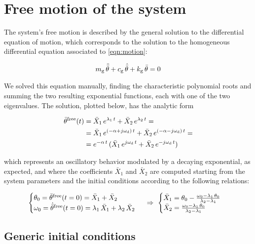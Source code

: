 \documentclass[a4paper,12pt,oneside]{article}
\begin{document}
\section{Free motion of the system}

The system's free motion is described by the general solution to the differential equation of motion, which corresponds to the solution to the homogeneous differential equation associated to \eqref{eqn:motion}:

\[
	m_\textup{g} \, \ddot{\bar{\theta}} + c_\textup{g} \, \dot{\bar{\theta}} +
		k_\textup{g} \, \bar{\theta} = 0
\]

We solved this equation manually, finding the characteristic polynomial roots and summing the two resulting exponential functions, each with one of the two eigenvalues. The solution, plotted below, has the analytic form

\[ \begin{split}
	\bar{\theta}^\textup{free}(t)	&
		= \bar{X}_1 \, e^{\lambda_1 \, t} + \bar{X}_2 \, e^{\lambda_2 \, t} = \\
	& = \bar{X}_1 \, e^{(-\alpha + j \omega_\textup{d}) \, t} +
		\bar{X}_2 \, e^{(-\alpha - j \omega_\textup{d}) \, t} = \\
	& = e^{-\alpha \, t} \, (\bar{X}_1 \, e^{j \omega_\textup{d} \, t} +
		\bar{X}_2 \, e^{- j \omega_\textup{d} \, t})
\end{split} \]

which represents an oscillatory behavior modulated by a decaying exponential, as expected, and where the coefficients $ \bar{X}_1 $ and $ \bar{X}_2 $ are computed starting from the system parameters and the initial conditions according to the following relations:

\[
	\begin{cases}
		\theta_0 = \bar{\theta}^\textup{free}(t = 0) = \bar{X}_1 + \bar{X}_2 \\
		\omega_0 = \dot{\bar{\theta}}^\textup{free}(t = 0) =
			\lambda_1 \, \bar{X}_1 + \lambda_2 \, \bar{X}_2
	\end{cases} ~ \Rightarrow ~
		\begin{cases}
			\bar{X}_1 = \theta_0 - \frac{\omega_0 - \lambda_1 \, \theta_0}
				{\lambda_2 - \lambda_1} \\
			\bar{X}_2 = \frac{\omega_0 - \lambda_1 \, \theta_0}{\lambda_2 - \lambda_1}
		\end{cases}
\]

\subsection{Generic initial conditions}
\label{subs:generic_initial_conditions}
\end{document}
